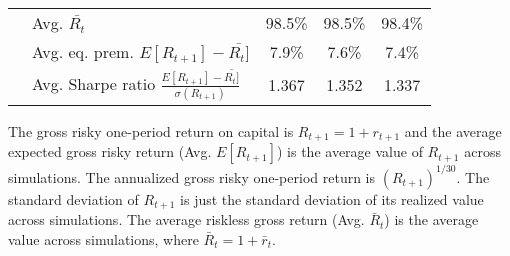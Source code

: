 \documentclass[letterpaper,12pt]{article}
\theoremstyle{definition}
\begin{document}
\begin{spacing}{1.5}
\begin{table}[htbp]
\begin{threeparttable}
\begin{tabular}{>{\small}l| >{\small}l| >{\small}c| >{\small}c| >{\small}c}
      & \quad Avg. $\bar{R_t}$ & 98.5\% & 98.5\% & 98.4\% \\
      & \quad Avg. eq. prem. $E[R_{t+1}] - \bar{R_t]}$ & 7.9\% & 7.6\% & 7.4\% \\
      & \quad Avg. Sharpe ratio $\frac{E[R_{t+1}] - \bar{R_t]}}{\sigma(R_{t+1})}$ & 1.367 & 1.352 & 1.337 \\
      \hline\hline
    \end{tabular}
    \begin{tablenotes}
      \scriptsize{\item[]The gross risky one-period return on capital is $R_{t+1} = 1 + r_{t+1}$ and the average expected gross risky return (Avg. $E[R_{t+1}]$) is the average value of $R_{t+1}$ across simulations. The annualized gross risky one-period return is $(R_{t+1})^{1/30}$. The standard deviation of $R_{t+1}$ is just the standard deviation of its realized value across simulations. The average riskless gross return (Avg. $\bar{R}_t$) is the average value across simulations, where $\bar{R}_t=1+\bar{r}_t$.}
    \end{tablenotes}
    \end{threeparttable}
  \end{table}


\end{spacing}
\end{document}

